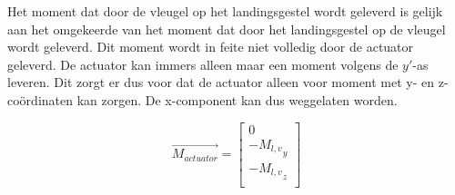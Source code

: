 Het moment dat door de vleugel op het landingsgestel wordt geleverd is gelijk aan het omgekeerde van het moment dat door het landingsgestel op de vleugel wordt geleverd.
Dit moment wordt in feite niet volledig door de actuator geleverd. De actuator kan immers alleen maar een moment volgens de $y'$-as leveren. Dit zorgt er dus voor dat de actuator alleen voor moment met y- en z-co\"ordinaten kan zorgen. De x-component kan dus weggelaten worden. 

\begin{equation}
\overrightarrow{M_{actuator}}=
\begin{bmatrix}
0\\
-{M_{l,v}}_{y}\\
-{M_{l,v}}_{z}\\
\end{bmatrix}
\end{equation}

